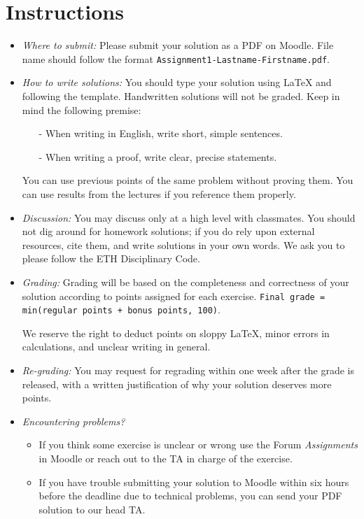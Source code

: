 \section*{Instructions}
\begin{itemize}
    \item \emph{Where to submit:} Please submit your solution as a PDF on Moodle. File name should follow the format \texttt{Assignment1-Lastname-Firstname.pdf}. 
    
    \item \emph{How to write solutions:} You should type your solution using LaTeX and following the template. Handwritten solutions will not be graded. Keep in mind the following premise: 
    \begin{itemize}
        \item[-] When writing in English, write short, simple sentences.
        \item[-] When writing a proof, write clear, precise statements. 
    \end{itemize}
    You can use previous points of the same problem without proving them. You can use results from the lectures if you reference them properly.
       
    \item \emph{Discussion:} You may discuss only at a high level with classmates. You should not dig around for homework solutions; if you do rely upon external resources, cite them, and write solutions in your own words. We ask you to please follow the ETH Disciplinary Code. 

    
    \item \emph{Grading:} Grading will be based on the completeness and correctness of your solution according to points assigned for each exercise. \texttt{Final grade = min(regular points + bonus points, 100)}.

    We reserve the right to deduct points on sloppy \LaTeX, minor errors in calculations, and unclear writing in general.
    
    \item \emph{Re-grading:} You may request for regrading within one week after the grade is released, with a written justification of why your solution deserves more points.

     
    \item \emph{Encountering problems?} 
    \begin{itemize}
       \item If you think some exercise is unclear or wrong use the Forum \textit{Assignments} in Moodle or reach out to the TA in charge of the exercise. 
        \item If you have trouble submitting your solution to Moodle within six hours before the deadline due to technical problems, you can send your PDF solution to our head TA. 
    \end{itemize}
\end{itemize}